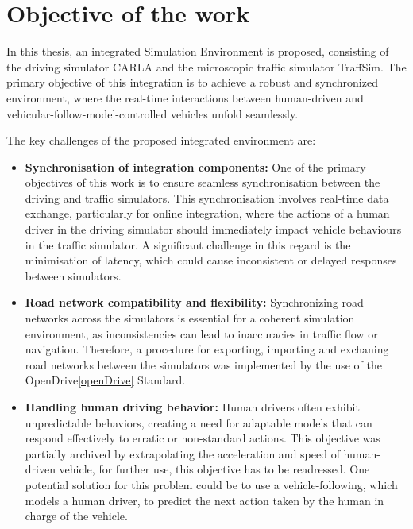 \section{Objective of the work}\label{sec:objective-of-the-work}
    In this thesis, an integrated Simulation Environment is proposed, consisting of the driving simulator CARLA\cite{carla2017} and the microscopic traffic simulator TraffSim\cite{backfrieder2013traffsim,backfrieder2014traffsim}.
    The primary objective of this integration is to achieve a robust and synchronized environment, where the real-time interactions between human-driven and vehicular-follow-model-controlled vehicles unfold seamlessly.

    The key challenges of the proposed integrated environment are:
    \begin{itemize}
        \item \textbf{Synchronisation of integration components:} {
            One of the primary objectives of this work is to ensure seamless synchronisation between the driving and traffic simulators.
            This synchronisation involves real-time data exchange, particularly for online integration, where the actions of a human driver in the driving simulator should immediately impact vehicle behaviours in the traffic simulator.
            A significant challenge in this regard is the minimisation of latency, which could cause inconsistent or delayed responses between simulators.
        }
        \item \textbf{Road network compatibility and flexibility:}{
            Synchronizing road networks across the simulators is essential for a coherent simulation environment, as inconsistencies can lead to inaccuracies in traffic flow or navigation.
            Therefore, a procedure for exporting, importing and exchaning road networks between the simulators was implemented by the use of the OpenDrive\ref{openDrive} Standard.
        }
        \item \textbf{Handling human driving behavior:}{
            Human drivers often exhibit unpredictable behaviors, creating a need for adaptable models that can respond effectively to erratic or non-standard actions.
            This objective was partially archived by extrapolating the acceleration and speed of human-driven vehicle, for further use, this objective has to be readressed.
            One potential solution for this problem could be to use a vehicle-following, which models a human driver\cite{Lindorfer2018}, to predict the next action taken by the human in charge of the vehicle.
        }
    \end{itemize}

